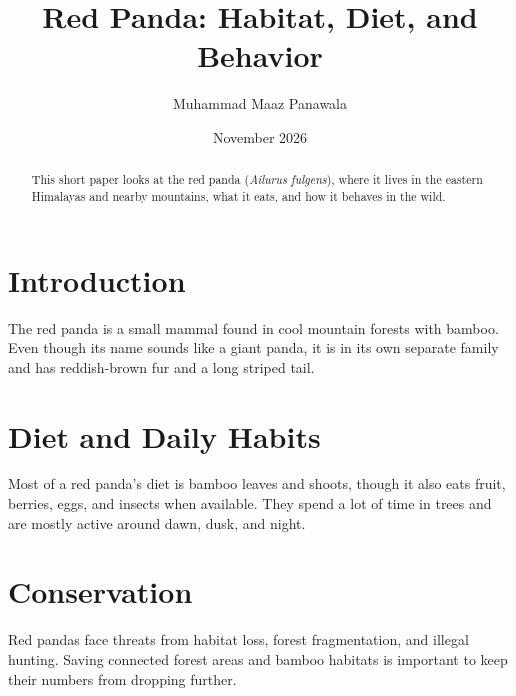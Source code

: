 \documentclass{article}
\title{Red Panda: Habitat, Diet, and Behavior}
\author{Muhammad Maaz Panawala}
\date{November 2026}
\begin{document}
\maketitle

\begin{abstract}
This short paper looks at the red panda (\textit{Ailurus fulgens}), where it lives in the eastern Himalayas and nearby mountains, what it eats, and how it behaves in the wild.
\end{abstract}

\section{Introduction}
The red panda is a small mammal found in cool mountain forests with bamboo. Even though its name sounds like a giant panda, it is in its own separate family and has reddish-brown fur and a long striped tail.

\section{Diet and Daily Habits}
Most of a red panda's diet is bamboo leaves and shoots, though it also eats fruit, berries, eggs, and insects when available. They spend a lot of time in trees and are mostly active around dawn, dusk, and night.

\section{Conservation}
Red pandas face threats from habitat loss, forest fragmentation, and illegal hunting. Saving connected forest areas and bamboo habitats is important to keep their numbers from dropping further.
\end{document}
